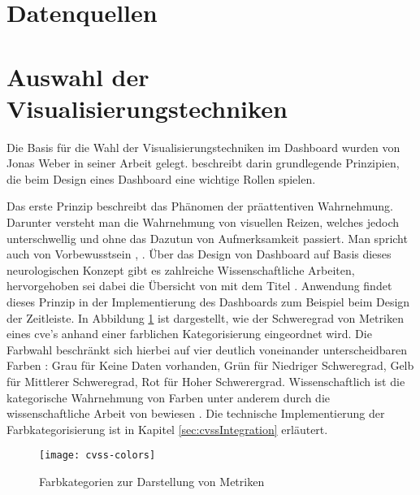 \section{Datenquellen}
\label{sec:datenquellen}
\section{Auswahl der Visualisierungstechniken}
\label{sec:auswahlDerVisualisierungstechniken}
Die Basis für die Wahl der Visualisierungstechniken im Dashboard wurden von Jonas Weber in seiner Arbeit  gelegt. \citeauthor{weberEvaluationDashboardTechniques} beschreibt darin grundlegende Prinzipien, die beim Design eines Dashboard eine wichtige Rollen spielen.
\par Das erste Prinzip beschreibt das Phänomen der präattentiven Wahrnehmung. Darunter versteht man die Wahrnehmung von visuellen Reizen, welches jedoch unterschwellig und ohne das Dazutun von Aufmerksamkeit passiert. Man spricht auch von Vorbewusstsein \autocite{PrC3A4attentiveWahrnehmung}, \autocite{mallotWahrnehmungPraeattentiveIm2021}. Über das Design von Dashboard auf Basis dieses neurologischen Konzept gibt es zahlreiche Wissenschaftliche Arbeiten, hervorgehoben sei dabei die Übersicht von \autocite{barrera-leonHowPreattentiveProcess2023} mit dem Titel  \autocite{barrera-leonHowPreattentiveProcess2023}. Anwendung findet dieses Prinzip in der Implementierung des Dashboards zum Beispiel beim Design der Zeitleiste. In Abbildung \ref{fig:cvss-colors} ist dargestellt, wie der Schweregrad von Metriken eines \gls{cve}'s anhand einer farblichen Kategorisierung eingeordnet wird. Die Farbwahl beschränkt sich hierbei auf vier deutlich voneinander unterscheidbaren Farben : Grau für Keine Daten vorhanden, Grün für Niedriger Schweregrad, Gelb für Mittlerer Schweregrad, Rot für Hoher Schwerergrad. Wissenschaftlich ist die kategorische Wahrnehmung von Farben unter anderem durch die wissenschaftliche Arbeit von \citeauthor{cliffordColorCategoriesAffect2010} bewiesen \autocite{cliffordColorCategoriesAffect2010}. Die technische Implementierung der Farbkategorisierung ist in Kapitel \ref{sec:cvssIntegration} erläutert.
%
\begin{figure}[H]
    \centering
    \texttt{[image: cvss-colors]}
    \caption{Farbkategorien zur Darstellung von Metriken}
    \label{fig:cvss-colors}
\end{figure}
